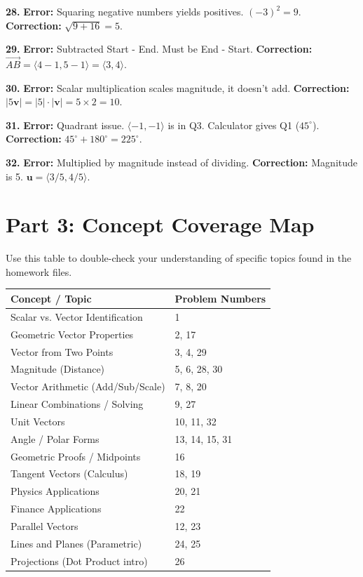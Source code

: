 \documentclass[12pt]{article}
\begin{document}
\textbf{28.} \textbf{Error:} Squaring negative numbers yields positives. $(-3)^2 = 9$.
\textbf{Correction:} $\sqrt{9 + 16} = 5$.

\textbf{29.} \textbf{Error:} Subtracted Start - End. Must be End - Start.
\textbf{Correction:} $\vec{AB} = \langle 4-1, 5-1 \rangle = \langle 3, 4 \rangle$.

\textbf{30.} \textbf{Error:} Scalar multiplication scales magnitude, it doesn't add.
\textbf{Correction:} $|5\mathbf{v}| = |5| \cdot |\mathbf{v}| = 5 \times 2 = 10$.

\textbf{31.} \textbf{Error:} Quadrant issue. $\langle -1, -1 \rangle$ is in Q3. Calculator gives Q1 ($45^\circ$).
\textbf{Correction:} $45^\circ + 180^\circ = 225^\circ$.

\textbf{32.} \textbf{Error:} Multiplied by magnitude instead of dividing.
\textbf{Correction:} Magnitude is 5. $\mathbf{u} = \langle 3/5, 4/5 \rangle$.

\newpage

\section*{Part 3: Concept Coverage Map}
Use this table to double-check your understanding of specific topics found in the homework files.

\begin{center}
\begin{tabular}{|l|l|}
\hline
\textbf{Concept / Topic} & \textbf{Problem Numbers} \\
\hline
Scalar vs. Vector Identification & 1 \\
\hline
Geometric Vector Properties & 2, 17 \\
\hline
Vector from Two Points & 3, 4, 29 \\
\hline
Magnitude (Distance) & 5, 6, 28, 30 \\
\hline
Vector Arithmetic (Add/Sub/Scale) & 7, 8, 20 \\
\hline
Linear Combinations / Solving & 9, 27 \\
\hline
Unit Vectors & 10, 11, 32 \\
\hline
Angle / Polar Forms & 13, 14, 15, 31 \\
\hline
Geometric Proofs / Midpoints & 16 \\
\hline
Tangent Vectors (Calculus) & 18, 19 \\
\hline
Physics Applications & 20, 21 \\
\hline
Finance Applications & 22 \\
\hline
Parallel Vectors & 12, 23 \\
\hline
Lines and Planes (Parametric) & 24, 25 \\
\hline
Projections (Dot Product intro) & 26 \\
\hline
\end{tabular}
\end{center}
\end{document}
